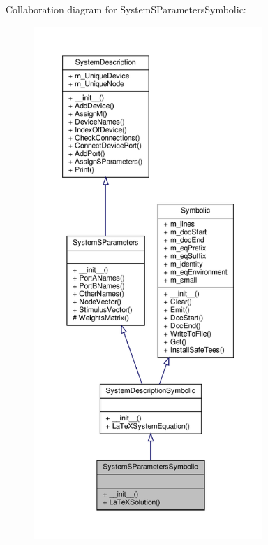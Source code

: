 Collaboration diagram for System\+S\+Parameters\+Symbolic\+:
\nopagebreak
\begin{figure}[H]
\begin{center}
\leavevmode
\includegraphics[height=550pt]{classSignalIntegrity_1_1SystemDescriptions_1_1SystemSParametersSymbolic_1_1SystemSParametersSymbolic__coll__graph}
\end{center}
\end{figure}
